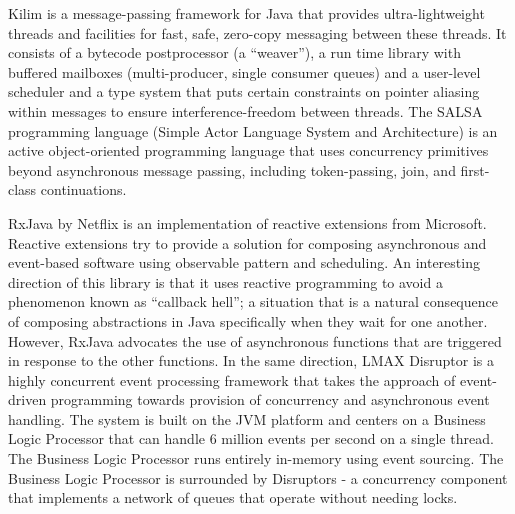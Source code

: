 Kilim \cite{srinivasan2008kilim} is a message-passing framework for Java that provides ultra-lightweight threads and facilities for fast, safe, zero-copy messaging between these threads.
It consists of a bytecode postprocessor (a ``weaver''), a run time library with buffered mailboxes (multi-producer, single consumer queues) and a user-level scheduler and a type system that puts certain constraints on pointer aliasing within messages to ensure interference-freedom between threads.
% 
The SALSA \cite{varela2007salsa,KarmaniSA09} programming language (Simple Actor Language System and Architecture) is an active object-oriented programming language that uses concurrency primitives beyond asynchronous message passing, including token-passing, join, and first-class continuations.
% 

RxJava \cite{rxjava} by Netflix is an implementation of reactive extensions \cite{rx} from Microsoft.  
Reactive extensions try to provide a solution for composing asynchronous and event-based software using observable pattern and scheduling.  
An interesting direction of this library is that it uses reactive programming to avoid a phenomenon known as ``callback hell''; a situation that is a natural consequence of composing  abstractions in Java specifically when they wait for one another.  
However, RxJava advocates the use of asynchronous functions that are triggered in response to the other functions.
% 
In the same direction, LMAX Disruptor \cite{lmax,lmax:mf} is a highly concurrent event processing framework that takes the approach of event-driven programming towards provision of concurrency and asynchronous event handling.
The system is built on the JVM platform and centers on a Business Logic Processor that can handle 6 million events per second on a single thread. 
The Business Logic Processor runs entirely in-memory using event sourcing. 
The Business Logic Processor is surrounded by Disruptors - a concurrency component that implements a network of queues that operate without needing locks.

